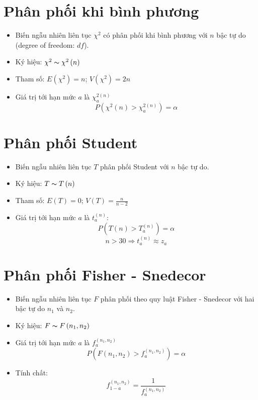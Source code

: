 \documentclass[utf8,a4paper]{article}
\begin{document}
\section[]{Phân phối khi bình phương}
\begin{itemize}
  \item Biến ngẫu nhiên liên tục \({\chi}^{2}\) có phân phối khi bình phương với
    \(n\) bậc tự do (degree of freedom: \(df\)).
  \item Ký hiệu: \({\chi}^{2} \thicksim {\chi}^{2}\left(n\right)\)
  \item Tham số: \(E\left({\chi}^{2}\right) = n\); \(V\left({\chi}^{2}\right) = 2n\)
  \item Giá trị tới hạn mức \(a\) là \({\chi}^{2(n)}_{a}\)
    \[P\left({\chi}^{2}\left(n\right) > {\chi}^{2\left(n\right)}_{a}\right) = \alpha\]
\end{itemize}

\section[]{Phân phối Student}
\begin{itemize}
  \item Biến ngẫu nhiên liên tục \(T\) phân phối Student với \(n\) bậc tự do.
  \item Ký hiệu: \(T \thicksim T\left(n\right)\)
  \item Tham số: \(E\left(T\right) = 0\); \(V\left(T\right) = \frac{n}{n - 2}\)
  \item Giá trị tới hạn mức \(a\) là \({t}^{\left(n\right)}_{a}\):
    \[P\left(T\left(n\right) > {T}^{\left(n\right)}_{a}\right) = \alpha\]
    \[n > 30 \Rightarrow {t}^{\left(n\right)}_{a} \approx {z}_{a}\]
\end{itemize}

\section[]{Phân phối Fisher - Snedecor}
\begin{itemize}
  \item Biến ngẫu nhiên liên tục \(F\) phân phối theo quy luật Fisher - Snedecor
    với hai bậc tự do \({n}_{1}\) và \({n}_{2}\).
  \item Ký hiệu: \(F \thicksim F\left({n}_{1}, {n}_{2}\right)\)
  \item Giá trị tới hạn mức \(a\) là \({f}^{\left({n}_{1}, {n}_{2}\right)}_{a}\)
    \[P\left(F\left({n}_{1}, {n}_{2}\right) > {f}^{\left({n}_{1}, {n}_{2}\right)}_{a}\right) = \alpha\]
  \item Tính chất:
    \[{f}^{\left({n}_{1}, {n}_{2}\right)}_{1 - a} = \frac{1}{{f}^{\left({n}_{1}, {n}_{2}\right)}_{a}}\]
\end{itemize}
\end{document}
